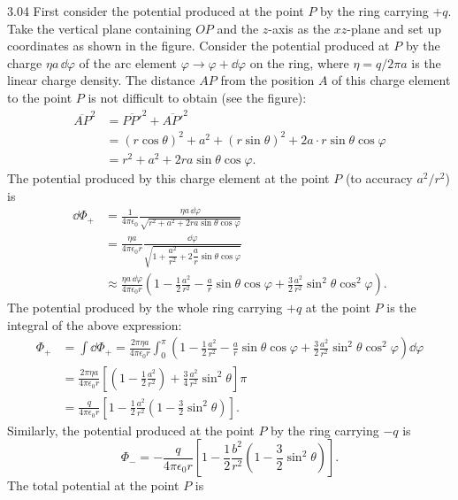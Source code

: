 \begin{solution}{3.04}
First consider the potential produced at the point $P$ by the ring carrying $+q$. Take the vertical plane containing $OP$ and the $z$-axis as the $xz$-plane and set up coordinates as shown in the figure. Consider the potential produced at $P$ by the charge $\eta a\,\dd\varphi$ of the arc element $\varphi\to\varphi+\dd\varphi$ on the ring, where $\eta=q/2\pi a$ is the linear charge density. The distance $AP$ from the position $A$ of this charge element to the point $P$ is not difficult to obtain (see the figure):
\begin{align*}
\overline{AP}^2&=\overline{PP'}^2+\overline{AP'}^2\\
&=(r\cos\theta)^2+a^2+(r\sin\theta)^2+2a\cdot r\sin\theta\cos\varphi\\
&=r^2+a^2+2ra\sin\theta\cos\varphi.
\end{align*}
The potential produced by this charge element at the point $P$ (to accuracy $a^2/r^2$) is
\begin{align*}
\dd\Phi_+&=\frac{1}{4\pi\epsilon_0}\frac{\eta a\,\dd\varphi}{\sqrt{r^2+a^2+2ra\sin\theta\cos\varphi}}\\
&=\frac{\eta a}{4\pi\epsilon_0r}\frac{\dd\varphi}{\sqrt{1+\dfrac{a^2}{r^2}+2\dfrac{a}{r}\sin\theta\cos\varphi}}\\
&\approx\frac{\eta a\,\dd\varphi}{4\pi\epsilon_0r}
\left(1-\frac{1}{2}\frac{a^2}{r^2}-\frac{a}{r}\sin\theta\cos\varphi
+\frac{3}{2}\frac{a^2}{r^2}\sin^2\theta\cos^2\varphi\right).
\end{align*}
The potential produced by the whole ring carrying $+q$ at the point $P$ is the integral of the above expression:
\begin{align*}
\Phi_+&=\int\dd\Phi_+
=\frac{2\pi\eta a}{4\pi\epsilon_0r}\int_0^\pi
\left(1-\frac{1}{2}\frac{a^2}{r^2}-\frac{a}{r}\sin\theta\cos\varphi
+\frac{3}{2}\frac{a^2}{r^2}\sin^2\theta\cos^2\varphi\right)\dd\varphi\\
&=\frac{2\pi\eta a}{4\pi\epsilon_0r}
\left[\left(1-\frac{1}{2}\frac{a^2}{r^2}\right)+\frac{3}{4}\frac{a^2}{r^2}\sin^2\theta\right]\pi\\
&=\frac{q}{4\pi\epsilon_0r}\left[1-\frac{1}{2}\frac{a^2}{r^2}
\left(1-\frac{3}{2}\sin^2\theta\right)\right].
\end{align*}
Similarly, the potential produced at the point $P$ by the ring carrying $-q$ is
\[
\Phi_-=-\frac{q}{4\pi\epsilon_0r}\left[1-\frac{1}{2}\frac{b^2}{r^2}
\left(1-\frac{3}{2}\sin^2\theta\right)\right].
\]
The total potential at the point $P$ is

\end{solution}
